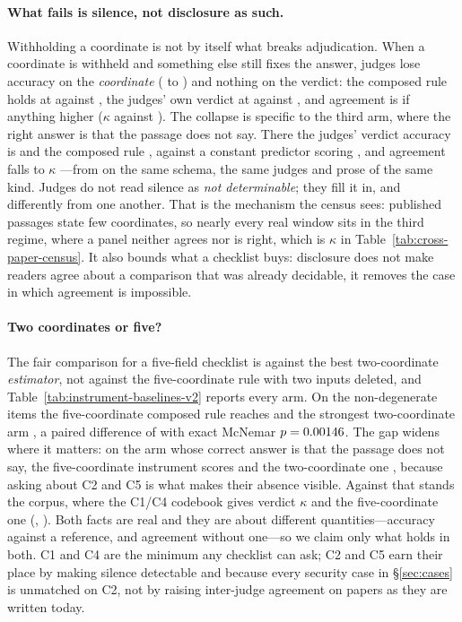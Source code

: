 \documentclass[11pt]{article}
\begin{document}


\paragraph{What fails is silence, not disclosure as such.}
Withholding a coordinate is not by itself what breaks adjudication. When a
coordinate is withheld and something else still fixes the answer, judges lose
accuracy on the \emph{coordinate} (\InsFullCoord{} to \InsBalCoord{}) and
nothing on the verdict: the composed rule holds at \InsBalRule{} against
\InsFullRule{}, the judges' own verdict at \InsBalJudge{} against
\InsFullJudge{}, and agreement is if anything higher ($\kappa$ \InsBalK{}
against \InsFullK{}). The collapse is specific to the third arm, where the right
answer is that the passage does not say. There the judges' verdict accuracy is
\InsForceJudge{} and the composed rule \InsForceRule{}, against a constant
predictor scoring \InsForceBase{}, and agreement falls to $\kappa$
\InsForceK{}---from \InsFullK{} on the same schema, the same judges and prose of
the same kind. Judges do not read silence as \emph{not determinable}; they fill
it in, and differently from one another. That is the mechanism the census sees:
published passages state few coordinates, so nearly every real window sits in
the third regime, where a panel neither agrees nor is right, which is $\kappa$
\DecVerdictK{} in Table~\ref{tab:cross-paper-census}. It also bounds what a
checklist buys: disclosure does not make readers agree about a comparison that
was already decidable, it removes the case in which agreement is impossible.

\paragraph{Two coordinates or five?}
The fair comparison for a five-field checklist is against the best
two-coordinate \emph{estimator}, not against the five-coordinate rule with two
inputs deleted, and Table~\ref{tab:instrument-baselines-v2} reports every arm.
On the non-degenerate items the five-coordinate composed rule reaches
\InsFiveAcc{} and the strongest two-coordinate arm \InsBestTwoAcc{}, a paired
difference of \InsFiveVsTwoDiff{} with exact McNemar $p=0.00146$. The gap
widens where it matters: on the arm whose correct answer is that the passage
does not say, the five-coordinate instrument scores \InsForceFive{} and the
two-coordinate one \InsForceTwo{}, because asking about C2 and C5 is what makes
their absence visible. Against that stands the corpus, where the C1/C4 codebook
gives verdict $\kappa$ \AblCFourK{} and the five-coordinate one \AblFiveK{}
(\AblCFourDelta{}, \AblCFourCI{}). Both facts are real and they are about
different quantities---accuracy against a reference, and agreement without
one---so we claim only what holds in both. C1 and C4 are the minimum any
checklist can ask; C2 and C5 earn their place by making silence detectable and
because every security case in \S\ref{sec:cases} is unmatched on C2, not by
raising inter-judge agreement on papers as they are written today.
\end{document}
